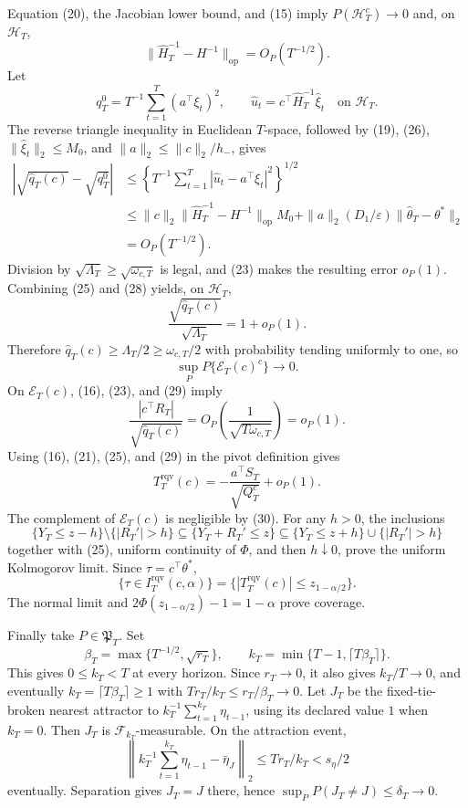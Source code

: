 Equation (20), the Jacobian lower bound, and (15) imply \(P(\mathcal H_T^c)\to0\) and, on \(\mathcal H_T\),
\[
 \|\widehat H_T^{-1}-H^{-1}\|_{\mathrm{op}}=O_P(T^{-1/2}).
\tag{26}
\]
Let
\[
 q_T^0=T^{-1}\sum_{t=1}^T(a^\top\xi_t)^2,\qquad
 \widehat u_t=c^\top\widehat H_T^{-1}\widehat\xi_t
 \quad\text{on }\mathcal H_T.
\tag{27}
\]
The reverse triangle inequality in Euclidean \(T\)-space, followed by (19), (26), \(\|\widehat\xi_t\|_2\le M_0\), and \(\|a\|_2\le\|c\|_2/h_-\), gives
\[
\begin{aligned}
 \left|\sqrt{\widehat q_T(c)}-\sqrt{q_T^0}\right|
 &\le\left\{T^{-1}\sum_{t=1}^T
 |\widehat u_t-a^\top\xi_t|^2\right\}^{1/2}\\
 &\le \|c\|_2\|\widehat H_T^{-1}-H^{-1}\|_{\mathrm{op}}M_0
 +\|a\|_2(D_1/\varepsilon)\|\widehat\theta_T-\theta^*\|_2\\
 &=O_P(T^{-1/2}).
\end{aligned}
\tag{28}
\]
Division by \(\sqrt{\Lambda_T}\ge\sqrt{\omega_{c,T}}\) is legal, and (23) makes the resulting error \(o_P(1)\).  Combining (25) and (28) yields, on \(\mathcal H_T\),
\[
 \frac{\sqrt{\widehat q_T(c)}}{\sqrt{\Lambda_T}}=1+o_P(1).
\tag{29}
\]
Therefore \(\widehat q_T(c)\ge\Lambda_T/2\ge\omega_{c,T}/2\) with probability tending uniformly to one, so
\[
 \sup_P P\{\mathcal E_T(c)^c\}\longrightarrow0.
\tag{30}
\]
On \(\mathcal E_T(c)\), (16), (23), and (29) imply
\[
 \frac{|c^\top R_T|}{\sqrt{\widehat q_T(c)}}
 =O_P\!\left(\frac1{\sqrt{T\omega_{c,T}}}\right)=o_P(1).
\tag{31}
\]
Using (16), (21), (25), and (29) in the pivot definition gives
\[
 T_T^{\mathrm{rqv}}(c)
 =-\frac{a^\top S_T}{\sqrt{Q_T^c}}+o_P(1).
\tag{32}
\]
The complement of \(\mathcal E_T(c)\) is negligible by (30).  For any \(h>0\), the inclusions
\[
 \{Y_T\le z-h\}\setminus\{|R_T'|>h\}
 \subseteq\{Y_T+R_T'\le z\}
 \subseteq\{Y_T\le z+h\}\cup\{|R_T'|>h\}
\tag{33}
\]
together with (25), uniform continuity of \(\Phi\), and then \(h\downarrow0\), prove the uniform Kolmogorov limit.  Since \(\tau=c^\top\theta^*\),
\[
 \{\tau\in I_T^{\mathrm{rqv}}(c,\alpha)\}
 =\{|T_T^{\mathrm{rqv}}(c)|\le z_{1-\alpha/2}\}.
\tag{34}
\]
The normal limit and \(2\Phi(z_{1-\alpha/2})-1=1-\alpha\) prove coverage.

Finally take \(P\in\mathfrak P_T\).  Set
\[
 \beta_T=\max\{T^{-1/2},\sqrt{r_T}\},\qquad
 k_T=\min\{T-1,\lceil T\beta_T\rceil\}.
\tag{35}
\]
This gives \(0\le k_T<T\) at every horizon.  Since \(r_T\to0\), it also gives \(k_T/T\to0\), and eventually \(k_T=\lceil T\beta_T\rceil\ge1\) with \(Tr_T/k_T\le r_T/\beta_T\to0\).  Let \(J_T\) be the fixed-tie-broken nearest attractor to \(k_T^{-1}\sum_{t=1}^{k_T}\eta_{t-1}\), using its declared value \(1\) when \(k_T=0\).  Then \(J_T\) is \(\mathcal F_{k_T}\)-measurable.  On the attraction event,
\[
 \left\|k_T^{-1}\sum_{t=1}^{k_T}\eta_{t-1}-\bar\eta_J\right\|_2
 \le Tr_T/k_T<s_\eta/2
\tag{36}
\]
eventually.  Separation gives \(J_T=J\) there, hence \(\sup_PP(J_T\ne J)\le\delta_T\to0\).


